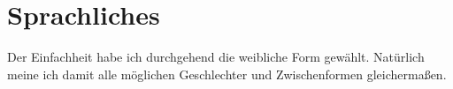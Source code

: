 \section*{Sprachliches}

Der Einfachheit habe ich durchgehend die weibliche Form gewählt. Natürlich meine ich damit alle möglichen Geschlechter und Zwischenformen gleichermaßen.
